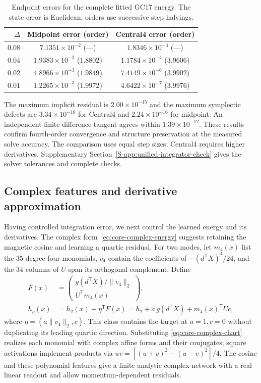 \begin{table}[t]
\centering
\caption{Endpoint errors for the complete fitted GC17 energy. The state
error is Euclidean; orders use successive step halvings.}
\label{tab:core-integrator}
\setlength{\tabcolsep}{3.5pt}
\begin{tabular}{rcc}
\toprule
$\Delta$ & Midpoint error (order) & Central4 error (order)\\
\midrule
$0.08$ & $7.1351\times10^{-2}$ (---) & $1.8346\times10^{-3}$ (---)\\
$0.04$ & $1.9383\times10^{-2}$ ($1.8802$) & $1.1784\times10^{-4}$ ($3.9606$)\\
$0.02$ & $4.8966\times10^{-3}$ ($1.9849$) & $7.4149\times10^{-6}$ ($3.9902$)\\
$0.01$ & $1.2265\times10^{-3}$ ($1.9972$) & $4.6422\times10^{-7}$ ($3.9976$)\\
\bottomrule
\end{tabular}
\end{table}

The maximum implicit residual is $2.00\times10^{-15}$ and the maximum
symplectic defects are $3.34\times10^{-16}$ for Central4 and
$2.24\times10^{-16}$ for midpoint. An independent finite-difference
tangent agrees within $1.39\times10^{-12}$. These results confirm fourth-order convergence
and structure preservation at the measured solve accuracy. The comparison
uses equal step sizes; Central4 requires higher derivatives.
Supplementary Section~\ref{S-app:unified-integrator-check} gives the
solver tolerances and complete checks.

\subsection{Complex features and derivative approximation}
\label{sec:core-approximation}
Having controlled integration error, we next control the learned energy
and its derivatives. The complex form~\eqref{eq:core-complex-energy}
suggests retaining the magnetic cosine and learning a quartic residual.
For two modes, let $m_4(x)$ list the $35$ degree-four monomials,
$v_4$ contain the coefficients of $-(d^{\mathsf T}X)^4/24$, and the
$34$ columns of $U$ span its orthogonal complement. Define
\begin{align}
 F(x)&=\begin{pmatrix}g(d^{\mathsf T}X)/\|v_4\|_2\\
                           U^{\mathsf T}m_4(x)\end{pmatrix},\nonumber\\
 h_\eta(x)&=h_2(x)+\eta^{\mathsf T}F(x)
          =h_2+a\,g(d^{\mathsf T}X)+m_4(x)^{\mathsf T}Uc,
 \label{eq:unified-feature-readout}
\end{align}
where $\eta=(a\|v_4\|_2,c)$. This class contains the target at $a=1,c=0$
without duplicating its leading quartic direction. Substituting
\eqref{eq:core-complex-chart} realizes each monomial with complex affine
forms and their conjugates; square activations implement products via
$uv=[(u+v)^2-(u-v)^2]/4$. The cosine and these polynomial features give
a finite analytic complex network with a real linear readout and allow
momentum-dependent residuals.

